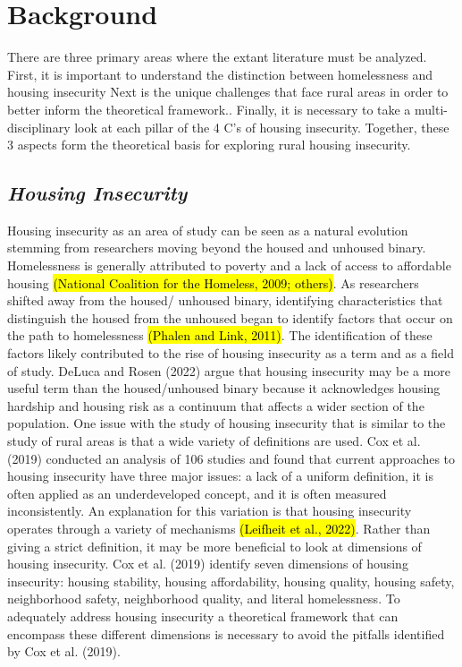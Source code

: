 \chapter{Background}	%
There are three primary areas where the extant literature must be analyzed. First,  it is important to understand the distinction between homelessness and housing insecurity Next is the unique challenges that face rural areas in order to better inform the theoretical framework.. Finally, it is necessary to take a multi-disciplinary look at each pillar of the 4 C's of housing insecurity. Together, these 3 aspects form the theoretical basis for exploring rural housing insecurity.

\section{\textit{Housing Insecurity}}

Housing insecurity as an area of study can be seen as a natural evolution stemming from researchers moving beyond the housed and unhoused binary.  Homelessness is generally attributed to poverty and a lack of access to affordable housing \hl{(National Coalition for the Homeless, 2009; others)}.  As researchers shifted away from the housed/ unhoused binary, identifying characteristics that distinguish the housed from the unhoused began to identify factors that occur on the path to homelessness \hl{(Phalen and Link, 2011)}.  The identification of these factors likely contributed to the rise of housing insecurity as a term and as a field of study.  DeLuca and Rosen (2022) argue that housing insecurity may be a more useful term than the housed/unhoused binary because it acknowledges housing hardship and housing risk as a continuum that affects a wider section of the population.  One issue with the study of housing insecurity that is similar to the study of rural areas is that a wide variety of definitions are used. Cox et al. (2019) conducted an analysis of 106 studies and found that current approaches to housing insecurity have three major issues: a lack of a uniform definition, it is often applied as an underdeveloped concept, and it is often measured inconsistently. An explanation for this variation is that housing insecurity operates through a variety of mechanisms \hl{(Leifheit et al., 2022)}.  Rather than giving a strict definition, it may be more beneficial to look at dimensions of housing insecurity. Cox et al. (2019) identify seven dimensions of housing insecurity: housing stability, housing affordability, housing quality, housing safety, neighborhood safety, neighborhood quality, and literal homelessness. To adequately address housing insecurity a theoretical framework that can encompass these different dimensions is necessary to avoid the pitfalls identified by Cox et al. (2019). 

